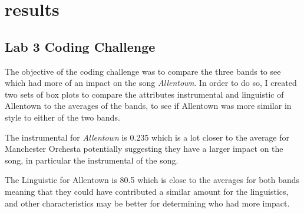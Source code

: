 \documentclass{article}\usepackage[]{graphicx}\usepackage[]{xcolor}
\begin{document}
\section{results}

\subsection{Lab 3 Coding Challenge}
The objective of the coding challenge was to compare the three bands to see which had more of an impact on the song \emph{Allentown}. In order to do so, I created two sets of box plots to compare the attributes instrumental and linguistic of Allentown to the averages of the bands, to see if Allentown was more similar in style to either of the two bands.


The instrumental for \emph{Allentown} is 0.235 which is a lot closer to the average for Manchester Orchesta potentially suggesting they have a larger impact on the song, in particular the instrumental of the song.

The Linguistic for Allentown is 80.5 which is close to the averages for both bands meaning that they could have contributed a similar amount for the linguistics, and other characteristics may be better for determining who had more impact.
\end{document}
